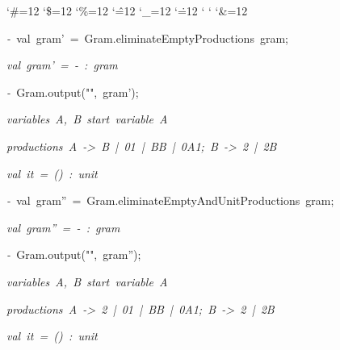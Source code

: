 \begin{list}{}
{\setlength{\leftmargin}{\leftmargini}
\setlength{\rightmargin}{0cm}
\setlength{\itemindent}{0cm}
\setlength{\listparindent}{0cm}
\setlength{\itemsep}{0cm}
\setlength{\parsep}{0cm}
\setlength{\labelsep}{0cm}
\setlength{\labelwidth}{0cm}
\catcode`\#=12
\catcode`\$=12
\catcode`\%=12
\catcode`\^=12
\catcode`\_=12
\catcode`\.=12
\catcode`
\catcode`
\catcode`\&=12
\ttfamily}
\small
\item[]\textsl{-\ }val\ gram'\ =\ Gram.eliminateEmptyProductions\ gram;
\item[]\textsl{val\ gram'\ =\ -\ :\ gram}
\item[]\textsl{-\ }Gram.output("",\ gram');
\item[]\textsl{variables\ A,\ B\ start\ variable\ A}
\item[]\textsl{productions\ A\ ->\ B\ |\ 01\ |\ BB\ |\ 0A1;\ B\ ->\ 2\ |\ 2B}
\item[]\textsl{val\ it\ =\ ()\ :\ unit}
\item[]\textsl{-\ }val\ gram''\ =\ Gram.eliminateEmptyAndUnitProductions\ gram;
\item[]\textsl{val\ gram''\ =\ -\ :\ gram}
\item[]\textsl{-\ }Gram.output("",\ gram'');
\item[]\textsl{variables\ A,\ B\ start\ variable\ A}
\item[]\textsl{productions\ A\ ->\ 2\ |\ 01\ |\ BB\ |\ 0A1;\ B\ ->\ 2\ |\ 2B}
\item[]\textsl{val\ it\ =\ ()\ :\ unit}
\end{list}
